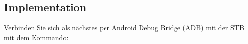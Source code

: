 


\subsection{Implementation}\label{sect.metastabil_blue}
Verbinden Sie sich als nächstes per Android Debug Bridge (ADB) mit der STB mit dem Kommando:
\newline
\newline